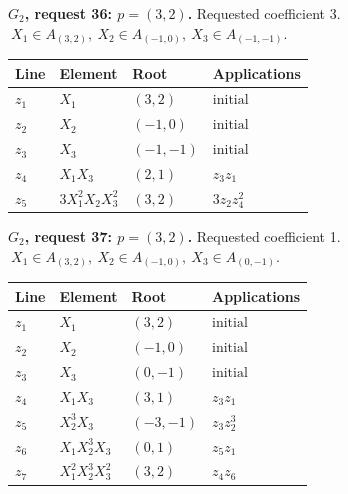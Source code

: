 \par\medskip\noindent\begin{minipage}{\textwidth}
\textbf{\(G_2\), request 36: \(p=(3,2)\).} Requested coefficient 3.
\(\ X_1\in A_{(3,2)},\ X_2\in A_{(-1,0)},\ X_3\in A_{(-1,-1)}.\)\par
\smallskip\centering\small\begin{tabular}{@{}llll@{}}\toprule
Line & Element & Root & Applications\\\midrule
\(z_{1}\) & \(X_1\) & \((3,2)\) & \(\text{initial}\) \\
\(z_{2}\) & \(X_2\) & \((-1,0)\) & \(\text{initial}\) \\
\(z_{3}\) & \(X_3\) & \((-1,-1)\) & \(\text{initial}\) \\
\(z_{4}\) & \(X_1X_3\) & \((2,1)\) & \(z_{3}z_{1}\) \\
\(z_{5}\) & \(3X_1^{2}X_2X_3^{2}\) & \((3,2)\) & \(3z_{2}z_{4}^{2}\) \\
\bottomrule\end{tabular}\end{minipage}\par
\par\medskip\noindent\begin{minipage}{\textwidth}
\textbf{\(G_2\), request 37: \(p=(3,2)\).} Requested coefficient 1.
\(\ X_1\in A_{(3,2)},\ X_2\in A_{(-1,0)},\ X_3\in A_{(0,-1)}.\)\par
\smallskip\centering\small\begin{tabular}{@{}llll@{}}\toprule
Line & Element & Root & Applications\\\midrule
\(z_{1}\) & \(X_1\) & \((3,2)\) & \(\text{initial}\) \\
\(z_{2}\) & \(X_2\) & \((-1,0)\) & \(\text{initial}\) \\
\(z_{3}\) & \(X_3\) & \((0,-1)\) & \(\text{initial}\) \\
\(z_{4}\) & \(X_1X_3\) & \((3,1)\) & \(z_{3}z_{1}\) \\
\(z_{5}\) & \(X_2^{3}X_3\) & \((-3,-1)\) & \(z_{3}z_{2}^{3}\) \\
\(z_{6}\) & \(X_1X_2^{3}X_3\) & \((0,1)\) & \(z_{5}z_{1}\) \\
\(z_{7}\) & \(X_1^{2}X_2^{3}X_3^{2}\) & \((3,2)\) & \(z_{4}z_{6}\) \\
\bottomrule\end{tabular}\end{minipage}\par
